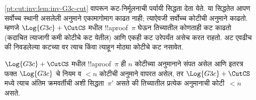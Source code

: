 \documentclass[../../../include/open-logic-section]{subfiles}
\begin{document}
\cref{pt:cut:inv:lem:inv-G3c-cut} वापरून
कट-निर्मूलनाची पर्यायी सिद्धता देता येते.
या सिद्धतेत आपण सर्वोच्च स्थानी असलेली
\CutCS{} अनुमाने एकामागोमाग काढत नाही;
त्याऐवजी सर्वोच्च कोटीची \CutCS{}
अनुमाने काढतो. म्हणजे
$\Log{G3c} + \CutCS$ मधील !!a{proof}~$\pi$
घेऊन तिच्यातील कोणताही कट काढतो
(कदाचित त्याजागी कमी कोटीचे कट येतील)
आणि एकही कट उरेपर्यंत असेच करत राहतो.
अट एवढीच की निवडलेल्या कटच्या वर
त्याच किंवा त्याहून मोठ्या कोटीचे
कट नसावेत.

\begin{lem}
$\Log{G3c}+\CutCS$ मधील !!a{proof}~$\pi$
ही $n$ कोटीच्या \CutCS{} अनुमानाने
संपत असेल आणि इतरत्र फक्त
$\Log{G3c}$ चे नियम व $<n$ कोटीची
\CutCS{} अनुमाने वापरत असेल, तर
$\Log{G3c} + \CutCS$ मध्ये
त्याच अंतिम क्रमवर्तीची अशी सिद्धता~$\pi'$
असते की तिच्यातील प्रत्येक \CutCS{}
अनुमानाची कोटी~$<n$ असते.
\end{lem}
\end{document}

